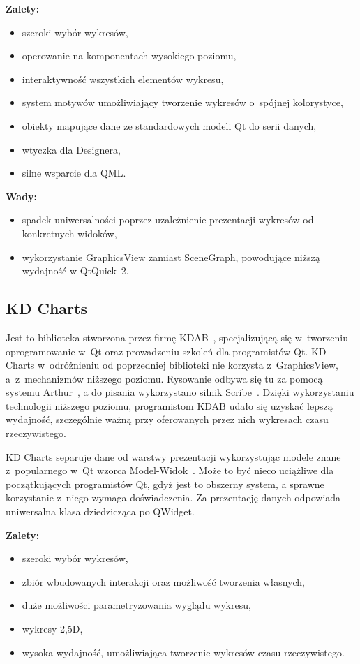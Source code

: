 \textbf{Zalety:}
\begin{itemize}
\item{szeroki wybór wykresów,}
\item{operowanie na komponentach wysokiego poziomu,}
\item{interaktywność wszystkich elementów wykresu,}
\item{system motywów umożliwiający tworzenie wykresów o~spójnej kolorystyce,}
\item{obiekty mapujące dane ze standardowych modeli Qt do serii danych,}
\item{wtyczka dla Designera,}
\item{silne wsparcie dla QML.}\newline
\end{itemize}

\textbf{Wady:}
\begin{itemize}
\item{spadek uniwersalności poprzez uzależnienie prezentacji wykresów od konkretnych widoków,}
\item{wykorzystanie GraphicsView zamiast SceneGraph, powodujące niższą wydajność w QtQuick~2.}
\end{itemize}


\subsection{KD Charts}
Jest to biblioteka stworzona przez firmę KDAB~\cite{kdab}, specjalizującą się w~tworzeniu oprogramowanie w~Qt oraz prowadzeniu szkoleń dla programistów Qt. KD Charts w~odróżnieniu od poprzedniej biblioteki nie korzysta z~GraphicsView, a~z~mechanizmów niższego poziomu. Rysowanie odbywa się tu za pomocą systemu Arthur~\cite{arthur}, a do pisania wykorzystano silnik Scribe~\cite{scribe}.
Dzięki wykorzystaniu technologii niższego poziomu, programistom KDAB udało się uzyskać lepszą wydajność, szczególnie ważną przy oferowanych przez nich wykresach czasu rzeczywistego.\newline

KD Charts separuje dane od warstwy prezentacji wykorzystując modele znane z~popularnego w~Qt wzorca Model-Widok~\cite{model-widok}. Może to być nieco uciążliwe dla początkujących programistów Qt, gdyż jest to obszerny system, a sprawne korzystanie z~niego wymaga doświadczenia.
Za prezentację danych odpowiada uniwersalna klasa dziedzicząca po QWidget.\newline

\textbf{Zalety:}
\begin{itemize}
\item{szeroki wybór wykresów,}
\item{zbiór wbudowanych interakcji oraz możliwość tworzenia własnych,}
\item{duże możliwości parametryzowania wyglądu wykresu,}
\item{wykresy 2,5D,}
\item{wysoka wydajność, umożliwiająca tworzenie wykresów czasu rzeczywistego.}\newline
\end{itemize}

